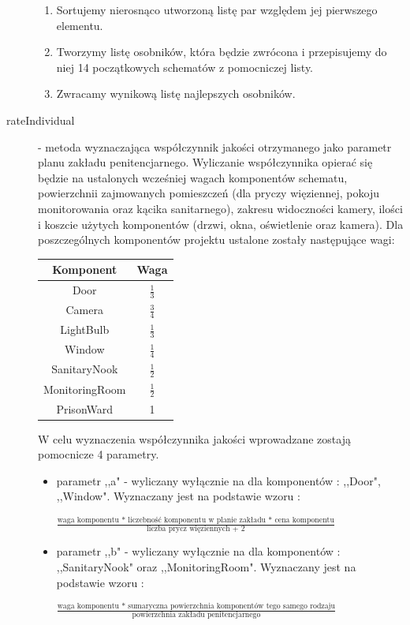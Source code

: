 \documentclass[10pt,oneside]{article}
\begin{document}
\begin{description}
\begin{enumerate}
			\item Sortujemy nierosnąco utworzoną listę par względem jej pierwszego elementu.
			\item Tworzymy listę osobników, która będzie zwrócona i przepisujemy do niej 14 początkowych schematów z pomocniczej listy.
			\item Zwracamy wynikową listę najlepszych osobników.
		\end{enumerate}
	
		\item[rateIndividual] - metoda wyznaczająca współczynnik jakości otrzymanego jako parametr planu zakładu penitencjarnego. Wyliczanie współczynnika opierać się będzie na ustalonych wcześniej wagach komponentów schematu, powierzchnii zajmowanych pomieszczeń (dla pryczy więziennej, pokoju monitorowania oraz kącika sanitarnego), zakresu widoczności kamery, ilości i koszcie użytych komponentów (drzwi, okna, oświetlenie oraz kamera).
		Dla poszczególnych komponentów projektu ustalone zostały następujące wagi:
		\begin{center}
			\begin{tabular}{|c|c|} \hline
				Komponent & Waga \\ \hline
				Door & $\frac{1}{3}$
				\\[10pt] Camera & $\frac{3}{4}$
				\\[10pt] LightBulb & $\frac{1}{3}$
				\\[10pt] Window & $\frac{1}{4}$
				\\[10pt] SanitaryNook & $\frac{1}{2}$
				\\[10pt] MonitoringRoom & $\frac{1}{2}$
				\\[10pt] PrisonWard & 1 \\ \hline
			\end{tabular}
		\end{center}
		W celu wyznaczenia współczynnika jakości wprowadzane zostają pomocnicze 4 parametry.
		\begin{itemize}
			\item parametr ,,a" - wyliczany wyłącznie na dla komponentów : ,,Door", ,,Window". Wyznaczany jest na podstawie wzoru :
			\begin{center}
				$\frac{\text{waga komponentu * liczebność komponentu w planie zakładu * cena komponentu}}{\text{liczba prycz więziennych + 2}}$
			\end{center}
		
			\item parametr ,,b" - wyliczany wyłącznie na dla komponentów : ,,SanitaryNook" oraz ,,MonitoringRoom". Wyznaczany jest na podstawie wzoru :
			\begin{center}
				$\frac{\text{waga komponentu * sumaryczna powierzchnia komponentów tego samego rodzaju}}{\text{powierzchnia zakładu penitencjarnego}}$
			\end{center}
		

\end{itemize}
\end{description}
\end{document}

